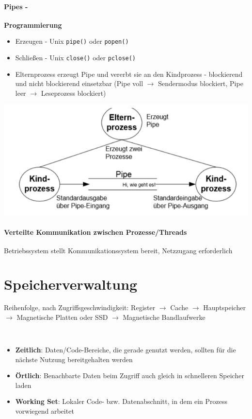 \documentclass[11pt,a4paper,landscape]{article}
\begin{document}
\begin{multicols*}{3}
	\paragraph{Pipes -} \textbf{Programmierung}
	\begin{itemize}
		\item Erzeugen - Unix \texttt{pipe()} oder \texttt{popen()}
		\item Schließen - Unix \texttt{close()} oder \texttt{pclose()}
		\item Elternprozess erzeugt Pipe und vererbt sie an den Kindprozess - blockierend und nicht blockierend einsetzbar (Pipe voll $\rightarrow$ Sendermodus blockiert, Pipe leer $\rightarrow$ Leseprozess blockiert)
	\end{itemize}
	\includegraphics[width=0.65\columnwidth]{pipe}
	\paragraph{Verteilte Kommunikation zwischen Prozesse/Threads} Betriebssystem stellt Kommunikationssystem bereit, Netzzugang erforderlich
	\section{Speicherverwaltung}
	Reihenfolge, nach Zugriffsgeschwindigkeit: Register $\rightarrow$ Cache $\rightarrow$ Hauptspeicher $\rightarrow$ Magnetische Platten oder SSD $\rightarrow$ Magnetische Bandlaufwerke
	\begin{description}[labelindent=0.0cm]
		\item[Lokalitätsprinzip]~\par
		\begin{itemize}[leftmargin=0.0cm]
			\item \textbf{Zeitlich}: Daten/Code-Bereiche, die gerade genutzt werden, sollten für die nächste Nutzung bereitgehalten werden
			\item \textbf{Örtlich}: Benachbarte Daten beim Zugriff auch gleich in schnelleren Speicher laden
			\item \textbf{Working Set}: Lokaler Code- bzw. Datenabschnitt, in dem ein Prozess vorwiegend arbeitet
		\end{itemize}
	\end{description}

\end{multicols*}
\end{document}
